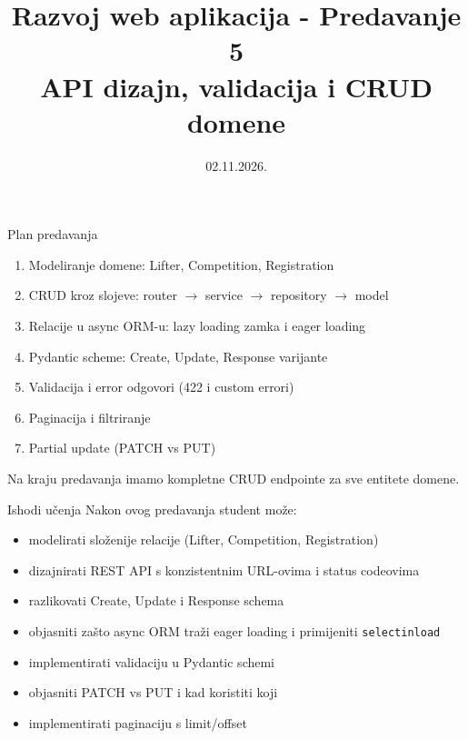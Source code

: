 

\title[Razvoj web aplikacija]{Razvoj web aplikacija - Predavanje 5 \\ API dizajn, validacija i CRUD domene}
\date{02.11.2026.}



\frame{\titlepage}

\begin{frame}{Plan predavanja}
\begin{enumerate}
  \item Modeliranje domene: Lifter, Competition, Registration
  \item CRUD kroz slojeve: router $\rightarrow$ service $\rightarrow$ repository $\rightarrow$ model
  \item Relacije u async ORM-u: lazy loading zamka i eager loading
  \item Pydantic scheme: Create, Update, Response varijante
  \item Validacija i error odgovori (422 i custom errori)
  \item Paginacija i filtriranje
  \item Partial update (PATCH vs PUT)
\end{enumerate}

\vspace{0.6em}
Na kraju predavanja imamo kompletne CRUD endpointe za sve entitete domene.
\end{frame}

\begin{frame}{Ishodi učenja}
Nakon ovog predavanja student može:
\begin{itemize}
  \item modelirati složenije relacije (Lifter, Competition, Registration)
  \item dizajnirati REST API s konzistentnim URL-ovima i status codeovima
  \item razlikovati Create, Update i Response schema
  \item objasniti zašto async ORM traži eager loading i primijeniti \texttt{selectinload}
  \item implementirati validaciju u Pydantic schemi
  \item objasniti PATCH vs PUT i kad koristiti koji
  \item implementirati paginaciju s limit/offset
\end{itemize}
\end{frame}

